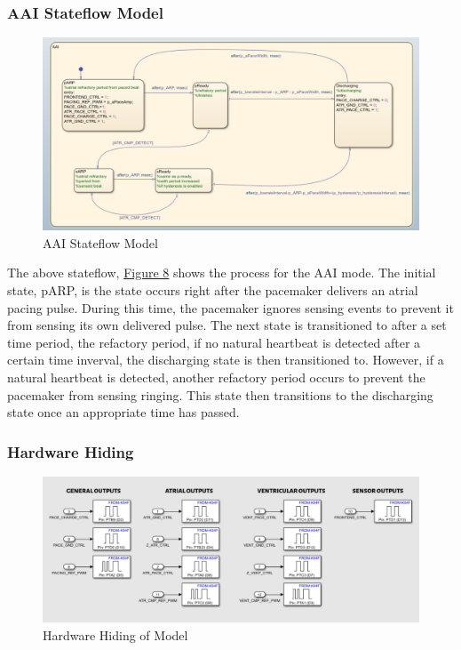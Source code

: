 \documentclass{article}
\begin{document}
\subsubsection{AAI Stateflow Model}
\begin{tcolorbox}
    \begin{figure}[H]
        \includegraphics[width=\textwidth]{AAI.png}
        \caption{AAI Stateflow Model}
        \label{AAISF}
    \end{figure}
\end{tcolorbox}
The above stateflow, \hyperref[AAISF]{Figure 8} shows the process for the AAI mode. The initial state, pARP, is 
the state occurs right after the pacemaker delivers an atrial pacing pulse. During this time, the pacemaker ignores 
sensing events to prevent it from sensing its own delivered pulse. The next state is transitioned to after 
a set time period, the refactory period, if no natural heartbeat is detected after a certain time inverval, the 
discharging state is then transitioned to. However, if a natural heartbeat is detected, another refactory period occurs 
to prevent the pacemaker from sensing ringing. This state then transitions to the discharging state once an appropriate time 
has passed. 

\newpage
\subsubsection{Hardware Hiding}

\begin{tcolorbox}
    \begin{figure}[H]
        \includegraphics[width=\textwidth]{HardwareHiding.png}
        \caption{Hardware Hiding of Model}
        \label{HardHide}
    \end{figure}
\end{tcolorbox}
\end{document}
